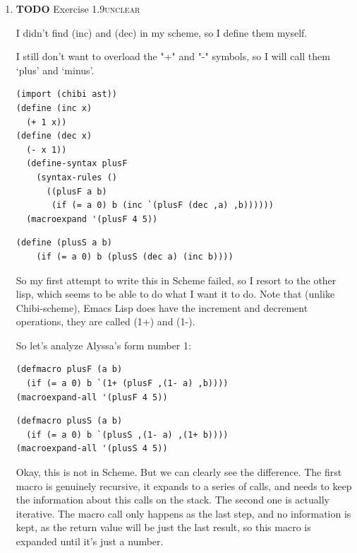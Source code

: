 \documentclass[11pt]{article}
\begin{document}
\begin{enumerate}
\begin{enumerate}
\item {\bfseries\sffamily TODO} Exercise 1.9\hfill{}\textsc{unclear}
\label{sec:orgf992072}

I didn't find (inc) and (dec) in my scheme, so I define them myself.

I still don't want to overload the "+" and "-" symbols, so I will call
them `plus' and `minus'.

\lstset{language=Lisp,label=org784f3c5,caption= ,captionpos=b,numbers=none}
\begin{lstlisting}
(import (chibi ast))
(define (inc x)
  (+ 1 x))
(define (dec x)
  (- x 1))
  (define-syntax plusF
    (syntax-rules ()
      ((plusF a b)
       (if (= a 0) b (inc `(plusF (dec ,a) ,b))))))
  (macroexpand '(plusF 4 5))

\end{lstlisting}

\lstset{language=Lisp,label=org4accaad,caption= ,captionpos=b,numbers=none}
\begin{lstlisting}
(define (plusS a b)
    (if (= a 0) b (plusS (dec a) (inc b))))
\end{lstlisting}

So my first attempt to write this in Scheme failed, so I resort to the
other lisp, which seems to be able to do what I want it to do. Note
that (unlike Chibi-scheme), Emacs Lisp does have the increment and
decrement operations, they are called (1+) and (1-).

So let's analyze Alyssa's form number 1:
\lstset{language=elisp,label=orgb683a77,caption= ,captionpos=b,numbers=none}
\begin{lstlisting}
(defmacro plusF (a b)
  (if (= a 0) b `(1+ (plusF ,(1- a) ,b))))
(macroexpand-all '(plusF 4 5))
\end{lstlisting}

\lstset{language=elisp,label=org153edee,caption= ,captionpos=b,numbers=none}
\begin{lstlisting}
(defmacro plusS (a b)
  (if (= a 0) b `(plusS ,(1- a) ,(1+ b))))
(macroexpand-all '(plusS 4 5))
\end{lstlisting}

Okay, this is not in Scheme. But we can clearly see the
difference. The first macro is genuinely recursive, it expands to a
series of calls, and needs to keep the information about this calls on
the stack. The second one is actually iterative. The macro call only
happens as the last step, and no information is kept, as the return
value will be just the last result, so this macro is expanded until
it's just a number.


\end{enumerate}
\end{enumerate}
\end{document}
